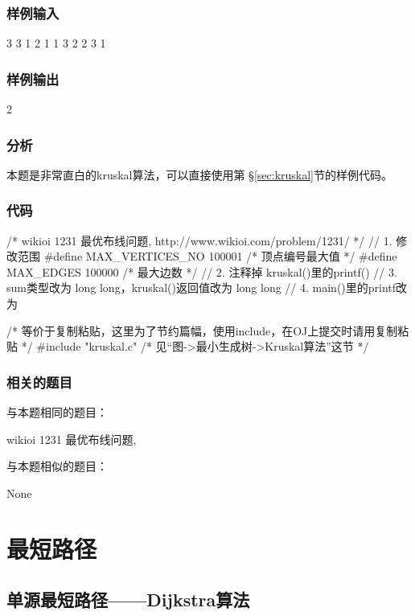 \subsubsection{样例输入}
\begin{Code}
3 3
1 2 1
1 3 2
2 3 1
\end{Code}

\subsubsection{样例输出}
\begin{Code}
2
\end{Code}

\subsubsection{分析}
本题是非常直白的kruskal算法，可以直接使用第 \S \ref{sec:kruskal}节的样例代码。

\subsubsection{代码}
\begin{Codex}[label=wiring.c]
/* wikioi 1231 最优布线问题, http://www.wikioi.com/problem/1231/ */
// 1. 修改范围
#define MAX_VERTICES_NO 100001 /* 顶点编号最大值 */
#define MAX_EDGES 100000  /* 最大边数 */
// 2. 注释掉 kruskal()里的printf()
// 3. sum类型改为 long long，kruskal()返回值改为 long long
// 4. main()里的printf改为 %

/* 等价于复制粘贴，这里为了节约篇幅，使用include，在OJ上提交时请用复制粘贴 */
#include "kruskal.c"  /* 见“图->最小生成树->Kruskal算法”这节 */
\end{Codex}

\subsubsection{相关的题目}
与本题相同的题目：
\begindot
\item wikioi 1231 最优布线问题, 
\myenddot

与本题相似的题目：
\begindot
\item None
\myenddot


\section{最短路径} %

\subsection{单源最短路径——Dijkstra算法}
\label{sec:dijkstra}

